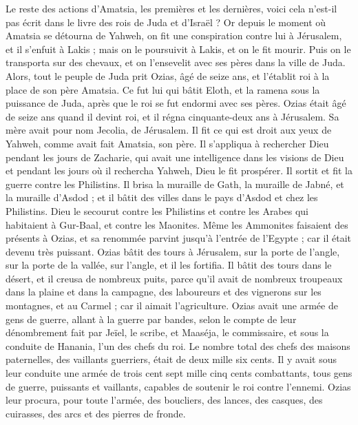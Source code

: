 \begin{multicols}{2}
Le reste des actions d'Amatsia, les premières et les dernières, voici cela n'est-il pas écrit dans le livre des rois de Juda et d'Israël ?
Or depuis le moment où Amatsia se détourna de Yahweh, on fit une conspiration contre lui à Jérusalem, et il s'enfuit à Lakis ; mais on le poursuivit à Lakis, et on le fit mourir.
Puis on le transporta sur des chevaux, et on l'ensevelit avec ses pères dans la ville de Juda.
\VerseOne{}Alors, tout le peuple de Juda prit Ozias, âgé de seize ans, et l'établit roi à la place de son père Amatsia.
Ce fut lui qui bâtit Eloth, et la ramena sous la puissance de Juda, après que le roi se fut endormi avec ses pères.
Ozias était âgé de seize ans quand il devint roi, et il régna cinquante-deux ans à Jérusalem. Sa mère avait pour nom Jecolia, de Jérusalem.
Il fit ce qui est droit aux yeux de Yahweh, comme avait fait Amatsia, son père.
Il s'appliqua à rechercher Dieu pendant les jours de Zacharie, qui avait une intelligence dans les visions de Dieu et pendant les jours où il rechercha Yahweh, Dieu le fit prospérer.
Il sortit et fit la guerre contre les Philistins. Il brisa la muraille de Gath, la muraille de Jabné, et la muraille d'Asdod ; et il bâtit des villes dans le pays d'Asdod et chez les Philistins.
Dieu le secourut contre les Philistins et contre les Arabes qui habitaient à Gur-Baal, et contre les Maonites.
Même les Ammonites faisaient des présents à Ozias, et sa renommée parvint jusqu'à l'entrée de l'Egypte ; car il était devenu très puissant.
Ozias bâtit des tours à Jérusalem, sur la porte de l'angle, sur la porte de la vallée, sur l'angle, et il les fortifia.
Il bâtit des tours dans le désert, et il creusa de nombreux puits, parce qu'il avait de nombreux troupeaux dans la plaine et dans la campagne, des laboureurs et des vignerons sur les montagnes, et au Carmel ; car il aimait l'agriculture.
Ozias avait une armée de gens de guerre, allant à la guerre par bandes, selon le compte de leur dénombrement fait par Jeïel, le scribe, et Maaséja, le commissaire, et sous la conduite de Hanania, l'un des chefs du roi.
Le nombre total des chefs des maisons paternelles, des vaillants guerriers, était de deux mille six cents.
Il y avait sous leur conduite une armée de trois cent sept mille cinq cents combattants, tous gens de guerre, puissants et vaillants, capables de soutenir le roi contre l'ennemi.
Ozias leur procura, pour toute l'armée, des boucliers, des lances, des casques, des cuirasses, des arcs et des pierres de fronde.

\end{multicols}
